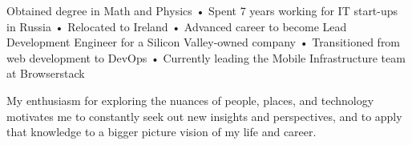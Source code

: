 

\begin{cvparagraph}

Obtained degree in Math and Physics • Spent 7 years working for IT start-ups in Russia • Relocated to Ireland • Advanced career to become Lead Development Engineer for a Silicon Valley-owned company • Transitioned from web development to DevOps • Currently leading the Mobile Infrastructure team at Browserstack

My enthusiasm for exploring the nuances of people, places, and technology motivates me to constantly seek out new insights and perspectives, and to apply that knowledge to a bigger picture vision of my life and career.

\end{cvparagraph}
